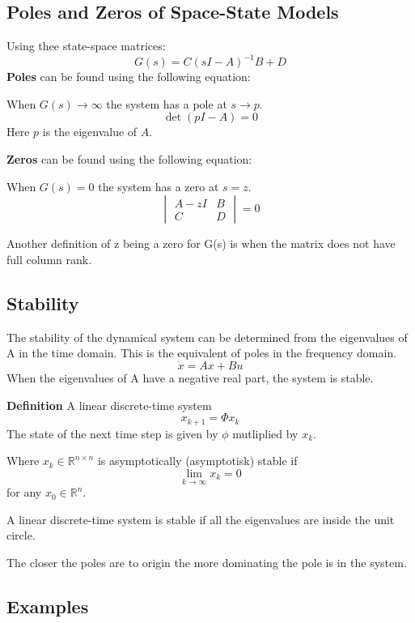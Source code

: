 \subsection{Poles and Zeros of Space-State Models}
Using thee state-space matrices:
$$G(s) = C(sI-A)^{-1}B+D$$
\textbf{Poles} can be found using the following equation:

When $G(s)\to \infty$ the system has a pole at $s\to p$.
$$\det(pI-A) = 0$$
Here $p$ is the eigenvalue of $A$.

\textbf{Zeros} can be found using the following equation:

When $G(s)=0$ the system has a zero at $s=z$.
$$\begin{vmatrix}
		A-zI & B \\
		C    & D
	\end{vmatrix} = 0$$

Another definition of z being a zero for G(s) is when the matrix does not have full column rank.


\subsection{Stability}
The stability of the dynamical system can be determined from the eigenvalues of A in the time domain.
This is the equivalent of poles in the frequency domain.
$$\dot{x} = Ax+Bu$$
When the eigenvalues of A have a negative real part, the system is stable.

\textbf{Definition}
A linear discrete-time system
$$x_{k+1}=\Phi x_k$$
The state of the next time step is given by $\phi$ mutliplied by $x_k$.

Where $x_k \in \mathbb{R}^{n \times n}$ is asymptotically (asymptotisk) stable if
$$\lim_{k \to \infty} x_k = 0$$
for any $x_0 \in \mathbb{R}^n$.

A linear discrete-time system is stable if all the eigenvalues are inside the unit circle.


The closer the poles are to origin the more dominating the pole is in the system.


\subsection{Examples}
